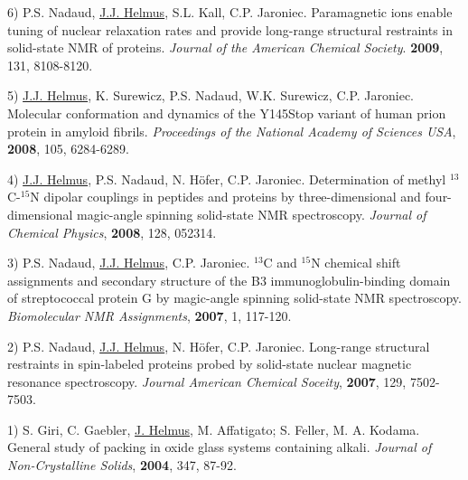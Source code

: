 \documentclass[margin,line]{res}
\begin{document}
\begin{resume}
6) P.S. Nadaud, \underline{J.J. Helmus}, S.L. Kall, C.P. Jaroniec.
Paramagnetic ions enable tuning of nuclear relaxation rates and provide long-range structural
restraints in solid-state NMR of proteins.
{\em Journal of the American Chemical Society}. {\bf 2009}, 131, 8108-8120.

5) \underline{J.J. Helmus}, K. Surewicz, P.S. Nadaud, W.K. Surewicz, C.P. Jaroniec.
Molecular conformation and dynamics of the Y145Stop variant of human prion protein in
amyloid fibrils.
{\em Proceedings of the National Academy of Sciences USA}, {\bf 2008}, 105, 6284-6289.

4) \underline{J.J. Helmus}, P.S. Nadaud, N. H\"{o}fer, C.P. Jaroniec.
Determination of methyl $^{13}$C-$^{15}$N dipolar couplings in peptides and proteins by
three-dimensional and four-dimensional magic-angle spinning solid-state NMR spectroscopy.
{\em Journal of  Chemical Physics}, {\bf 2008}, 128, 052314.

3) P.S. Nadaud, \underline{J.J. Helmus}, C.P. Jaroniec.
$^{13}$C and $^{15}$N chemical shift assignments and secondary structure of the
B3 immunoglobulin-binding domain of streptococcal protein G by magic-angle spinning
solid-state NMR spectroscopy.
{\em Biomolecular NMR Assignments}, {\bf 2007}, 1, 117-120.

2) P.S. Nadaud, \underline{J.J. Helmus}, N. H\"{o}fer, C.P. Jaroniec.
Long-range structural restraints in spin-labeled proteins probed by solid-state nuclear magnetic
resonance spectroscopy.
{\em Journal American Chemical Soceity}, {\bf 2007}, 129, 7502-7503.

1) S. Giri, C. Gaebler, \underline{J. Helmus}, M. Affatigato; S. Feller, M. A. Kodama.
General study of packing in oxide glass systems containing alkali.
{\em Journal of Non-Crystalline Solids}, {\bf 2004}, 347, 87-92.


\end{resume}
\end{document}
